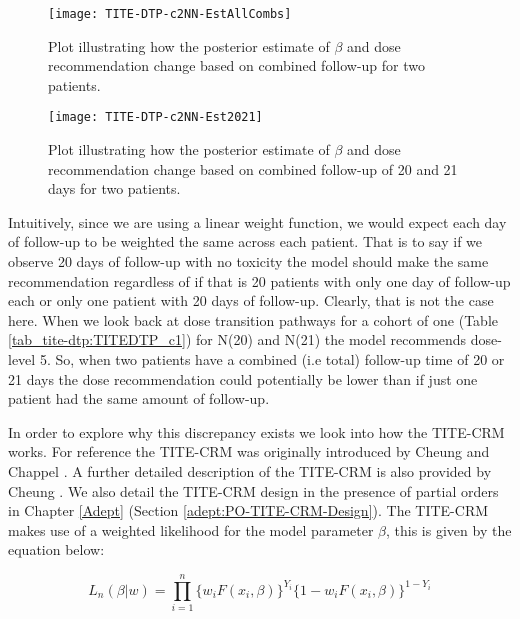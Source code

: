 \begin{figure}[h!]
	\centering
	\caption[Changes in $\beta$ based on combined follow-up for two patients.]{Plot illustrating how the posterior estimate of $\beta$ and dose recommendation change based on combined follow-up for two patients.}
	\label{fig_tite-dtp:c2NNEstAllCombs}
	\texttt{[image: TITE-DTP-c2NN-EstAllCombs]}
\end{figure}

\begin{figure}[h!]
	\centering
	\caption[Changes in $\beta$ based on combined follow-up of 20 and 21 days for two patients.]{Plot illustrating how the posterior estimate of $\beta$ and dose recommendation change based on combined follow-up of 20 and 21 days for two patients.}
	\label{fig_tite-dtp:c2NNEst2021}
	\texttt{[image: TITE-DTP-c2NN-Est2021]}
\end{figure}

Intuitively, since we are using a linear weight function, we would expect each day of follow-up to be weighted the same across each patient. That is to say if we observe 20 days of follow-up with no toxicity the model should make the same recommendation regardless of if that is 20 patients with only one day of follow-up each or only one patient with 20 days of follow-up. Clearly, that is not the case here. When we look back at dose transition pathways for a cohort of one (Table \ref{tab_tite-dtp:TITEDTP_c1}) for N(20) and N(21) the model recommends dose-level 5. So, when two patients have a combined (i.e total) follow-up time of 20 or 21 days the dose recommendation could potentially be lower than if just one patient had the same amount of follow-up.   

In order to explore why this discrepancy exists we look into how the TITE-CRM works. For reference the TITE-CRM was originally introduced by Cheung and Chappel \cite{cheungSequentialDesignsPhase2000}. A further detailed description of the TITE-CRM is also provided by Cheung \cite{cheungDoseFindingContinual2011}. We also detail the TITE-CRM design in the presence of partial orders in Chapter \ref{Adept} (Section \ref{adept:PO-TITE-CRM-Design}). The TITE-CRM makes use of a weighted likelihood for the model parameter $\beta$, this is given by the equation below: 

\begin{equation}
	\label{eq_tite-dtp:titelikelihood}
	{L}_n(\beta|w)=\prod_{i=1}^{n}\{w_i F(x_i,\beta)\}^{Y_i} \{1-w_i F(x_i,\beta)\}^{1-Y_i}
\end{equation}

